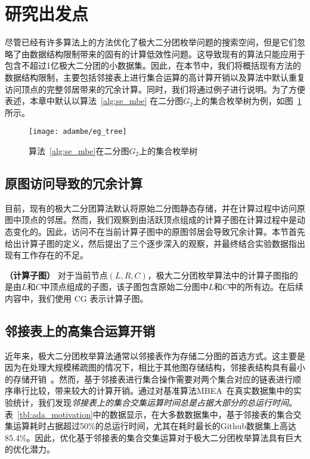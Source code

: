 \section{研究出发点}

尽管已经有许多算法上的方法优化了极大二分团枚举问题的搜索空间，但是它们忽略了由数据结构限制带来的固有的计算低效性问题。这导致现有的算法只能应用于包含不超过1亿极大二分团的小数据集。因此，在本节中，我们将概括现有方法的数据结构限制，主要包括邻接表上进行集合运算的高计算开销以及算法中默认重复访问顶点的完整邻居带来的冗余计算。同时，我们将通过例子进行说明。为了方便表述，本章中默认以算法~\ref{alg:se_mbe} 在二分图$G_2$上的集合枚举树为例，如图~\ref{fig:ada_tree}所示。

\begin{figure} [t]
	\centering
  \vspace{0.1in}
	\texttt{[image: adambe/eg\_tree]}
  \vspace{0.1in}
	\caption{算法~\ref{alg:se_mbe}在二分图$G_2$上的集合枚举树}

	\label{fig:ada_tree}
\end{figure}

\subsection{原图访问导致的冗余计算}

目前，现有的极大二分团算法默认将原始二分图静态存储，并在计算过程中访问原图中顶点的邻居。然而，我们观察到由活跃顶点组成的计算子图在计算过程中是动态变化的。因此，访问不在当前计算子图中的原图邻居会导致冗余计算。本节首先给出计算子图的定义，然后提出了三个逐步深入的观察，并最终结合实验数据指出现有工作存在的不足。

\begin{definition}

	\textbf{（计算子图）} 对于当前节点$(L,R,C)$，极大二分团枚举算法中的计算子图指的是由$L$和$C$中顶点组成的子图，该子图包含原始二分图中$L$和$C$中的所有边。在后续内容中，我们使用 CG 表示计算子图。

	
\end{definition}



\subsection{邻接表上的高集合运算开销}



近年来，极大二分团枚举算法通常以邻接表作为存储二分图的首选方式。这主要是因为在处理大规模稀疏图的情况下，相比于其他图存储结构，邻接表结构具有最小的存储开销~\cite{PMBE20,ooMBE22}。然而，基于邻接表进行集合操作需要对两个集合对应的链表进行顺序串行比较，带来较大的计算开销。通过对基准算法MBEA~\cite{iMBEA14}在真实数据集中的实验统计，我们发现\emph{邻接表上的集合交集运算时间总是占据大部分的总运行时间}。表~\ref{tbl:ada_motivation}中的数据显示，在大多数数据集中，基于邻接表的集合交集运算耗时占据超过50\%的总运行时间，尤其在耗时最长的Github数据集上高达85.4\%。因此，优化基于邻接表的集合交集运算对于极大二分团枚举算法具有巨大的优化潜力。

